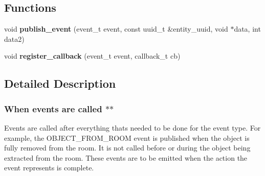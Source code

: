 \subsection*{Functions}
\begin{DoxyCompactItemize}
\item 
\mbox{\label{namespacemods_1_1events_a9b40c21cb88b3f979bf3cca718383ca2}} 
void {\bfseries publish\+\_\+event} (event\+\_\+t event, const uuid\+\_\+t \&entity\+\_\+uuid, void $\ast$data, int data2)
\item 
\mbox{\label{namespacemods_1_1events_ae933de869604800f486e8c9d80e409ea}} 
void {\bfseries register\+\_\+callback} (event\+\_\+t event, callback\+\_\+t cb)
\end{DoxyCompactItemize}


\subsection{Detailed Description}
\subsubsection*{When events are called $\ast$$\ast$ }

Events are called after everything that\textquotesingle{}s needed to be done for the event type. For example, the O\+B\+J\+E\+C\+T\+\_\+\+F\+R\+O\+M\+\_\+\+R\+O\+OM event is published when the object is fully removed from the room. It is not called before or during the object being extracted from the room. These events are to be emitted when the action the event represents is complete. 